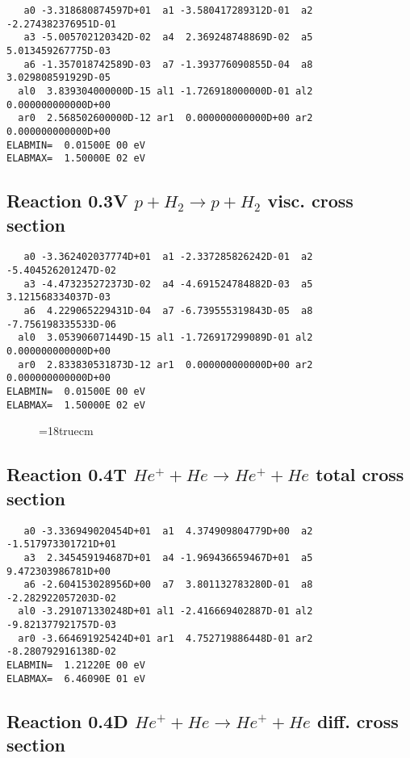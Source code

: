 \begin{verbatim}
   a0 -3.318680874597D+01  a1 -3.580417289312D-01  a2 -2.274382376951D-01
   a3 -5.005702120342D-02  a4  2.369248748869D-02  a5  5.013459267775D-03
   a6 -1.357018742589D-03  a7 -1.393776090855D-04  a8  3.029808591929D-05
  al0  3.839304000000D-15 al1 -1.726918000000D-01 al2  0.000000000000D+00
  ar0  2.568502600000D-12 ar1  0.000000000000D+00 ar2  0.000000000000D+00
ELABMIN=  0.01500E 00 eV
ELABMAX=  1.50000E 02 eV
\end{verbatim}

\subsection{
Reaction 0.3V   $  p + H_2 \rightarrow p + H_2  $ visc. cross section
}


\begin{verbatim}
   a0 -3.362402037774D+01  a1 -2.337285826242D-01  a2 -5.404526201247D-02
   a3 -4.473235272373D-02  a4 -4.691524784882D-03  a5  3.121568334037D-03
   a6  4.229065229431D-04  a7 -6.739555319843D-05  a8 -7.756198335533D-06
  al0  3.053906071449D-15 al1 -1.726917299089D-01 al2  0.000000000000D+00
  ar0  2.833830531873D-12 ar1  0.000000000000D+00 ar2  0.000000000000D+00
ELABMIN=  0.01500E 00 eV
ELABMAX=  1.50000E 02 eV
\end{verbatim}


\begin{figure} \label{0.3}
\epsfxsize=18truecm
\end{figure}
\newpage


\subsection{
Reaction 0.4T   $  He^+ + He \rightarrow He^+ + He $  total cross section
}



\begin{verbatim}
   a0 -3.336949020454D+01  a1  4.374909804779D+00  a2 -1.517973301721D+01
   a3  2.345459194687D+01  a4 -1.969436659467D+01  a5  9.472303986781D+00
   a6 -2.604153028956D+00  a7  3.801132783280D-01  a8 -2.282922057203D-02
  al0 -3.291071330248D+01 al1 -2.416669402887D-01 al2 -9.821377921757D-03
  ar0 -3.664691925424D+01 ar1  4.752719886448D-01 ar2 -8.280792916138D-02
ELABMIN=  1.21220E 00 eV
ELABMAX=  6.46090E 01 eV
\end{verbatim}

\subsection{
Reaction 0.4D    $He^+ + He \rightarrow He^+ + He$   diff. cross section
}



